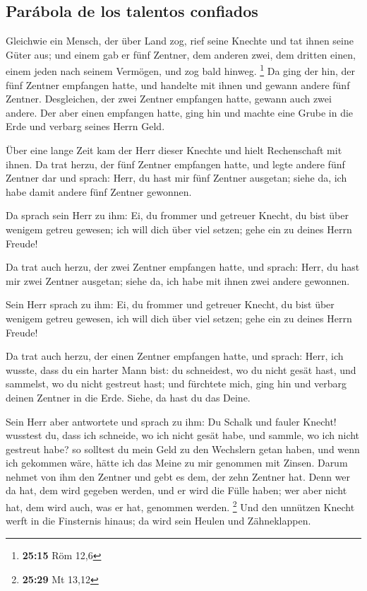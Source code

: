 \hypertarget{paruxe1bola-de-los-talentos-confiados}{%
\subsection{Parábola de los talentos
confiados}\label{paruxe1bola-de-los-talentos-confiados}}

 Gleichwie ein Mensch, der über Land zog, rief seine
Knechte und tat ihnen seine Güter aus;  und einem gab er
fünf Zentner, dem anderen zwei, dem dritten einen, einem jeden nach
seinem Vermögen, und zog bald hinweg. \footnote{\textbf{25:15} Röm 12,6}
 Da ging der hin, der fünf Zentner empfangen hatte, und
handelte mit ihnen und gewann andere fünf Zentner. 
Desgleichen, der zwei Zentner empfangen hatte, gewann auch zwei andere.
 Der aber einen empfangen hatte, ging hin und machte eine
Grube in die Erde und verbarg seines Herrn Geld.

 Über eine lange Zeit kam der Herr dieser Knechte und
hielt Rechenschaft mit ihnen.  Da trat herzu, der fünf
Zentner empfangen hatte, und legte andere fünf Zentner dar und sprach:
Herr, du hast mir fünf Zentner ausgetan; siehe da, ich habe damit andere
fünf Zentner gewonnen.

 Da sprach sein Herr zu ihm: Ei, du frommer und getreuer
Knecht, du bist über wenigem getreu gewesen; ich will dich über viel
setzen; gehe ein zu deines Herrn Freude!

 Da trat auch herzu, der zwei Zentner empfangen hatte,
und sprach: Herr, du hast mir zwei Zentner ausgetan; siehe da, ich habe
mit ihnen zwei andere gewonnen.

 Sein Herr sprach zu ihm: Ei, du frommer und getreuer
Knecht, du bist über wenigem getreu gewesen, ich will dich über viel
setzen; gehe ein zu deines Herrn Freude!

 Da trat auch herzu, der einen Zentner empfangen hatte,
und sprach: Herr, ich wusste, dass du ein harter Mann bist: du
schneidest, wo du nicht gesät hast, und sammelst, wo du nicht gestreut
hast;  und fürchtete mich, ging hin und verbarg deinen
Zentner in die Erde. Siehe, da hast du das Deine.

 Sein Herr aber antwortete und sprach zu ihm: Du Schalk
und fauler Knecht! wusstest du, dass ich schneide, wo ich nicht gesät
habe, und sammle, wo ich nicht gestreut habe?  so
solltest du mein Geld zu den Wechslern getan haben, und wenn ich
gekommen wäre, hätte ich das Meine zu mir genommen mit Zinsen.
 Darum nehmet von ihm den Zentner und gebt es dem, der
zehn Zentner hat.  Denn wer da hat, dem wird gegeben
werden, und er wird die Fülle haben; wer aber nicht hat, dem wird auch,
was er hat, genommen werden. \footnote{\textbf{25:29} Mt 13,12}
 Und den unnützen Knecht werft in die Finsternis hinaus;
da wird sein Heulen und Zähneklappen.

